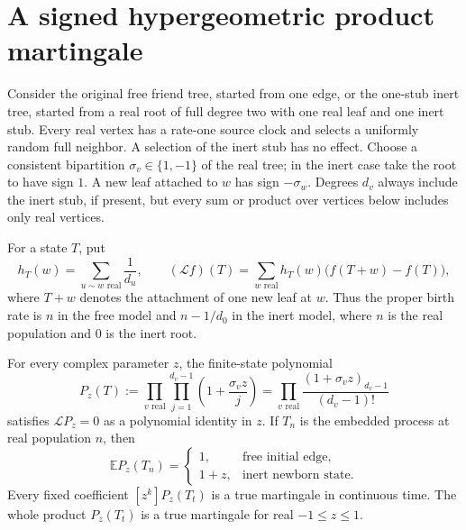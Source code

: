 
\section{A signed hypergeometric product martingale}
\label{sec:bipartite-product-martingale}

Consider the original free friend tree, started from one edge, or the
one-stub inert tree, started from a real root of full degree two with one
real leaf and one inert stub.  Every real vertex has a rate-one source
clock and selects a uniformly random full neighbor.  A selection of the
inert stub has no effect.  Choose a consistent bipartition
$\sigma_v\in\{1,-1\}$ of the real tree; in the inert case take the root
to have sign $1$.  A new leaf attached to $w$ has sign $-\sigma_w$.
Degrees $d_v$ always include the inert stub, if present, but every sum
or product over vertices below includes only real vertices.

For a state $T$, put
\[
 h_T(w)=\sum_{u\sim w\text{ real}}\frac1{d_u},\qquad
 (\mathcal L f)(T)=\sum_{w\text{ real}}h_T(w)
       \bigl(f(T+w)-f(T)\bigr),
\]
where $T+w$ denotes the attachment of one new leaf at $w$.  Thus the
proper birth rate is $n$ in the free model and $n-1/d_0$ in the inert
model, where $n$ is the real population and $0$ is the inert root.

\begin{proposition}
\label{prop:bipartite-product}
For every complex parameter $z$, the finite-state polynomial
\begin{equation}
 P_z(T):=\prod_{v\text{ real}}\prod_{j=1}^{d_v-1}
       \left(1+\frac{\sigma_vz}{j}\right)
   =\prod_{v\text{ real}}
       \frac{(1+\sigma_vz)_{d_v-1}}{(d_v-1)!}
 \label{eq:bipartite-P}
\end{equation}
satisfies $\mathcal LP_z=0$ as a polynomial identity in $z$.
If $T_n$ is the embedded process at real population $n$, then
\begin{equation}
 \mathbb E P_z(T_n)=
 \begin{cases}
  1,&\text{free initial edge},\\
  1+z,&\text{inert newborn state}.
 \end{cases}
 \label{eq:bipartite-normalization}
\end{equation}
Every fixed coefficient $[z^k]P_z(T_t)$ is a true martingale in continuous
time.  The whole product $P_z(T_t)$ is a true martingale for real
$-1\le z\le1$.
\end{proposition}

